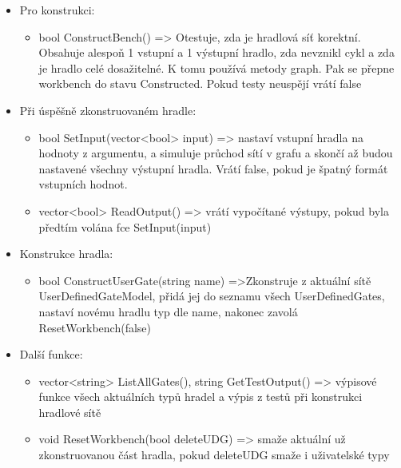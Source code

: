 \documentclass[12pt, oneside]{article}
\begin{document}
\begin{itemize}
\begin{itemize}
\begin{itemize}
\end{itemize}  
\item Pro konstrukci:
\begin{itemize} 
\item bool ConstructBench() => Otestuje, zda je hradlová síť korektní. Obsahuje alespoň 1 vstupní a 1 výstupní hradlo, zda nevznikl cykl a zda je hradlo celé dosažitelné. K tomu používá metody graph. Pak se přepne workbench do stavu Constructed. Pokud testy neuspějí vrátí false
\end{itemize} 
\item Při úspěšně zkonstruovaném hradle:
\begin{itemize}
\item bool SetInput(vector<bool> input) => nastaví vstupní hradla na hodnoty z argumentu, a simuluje průchod sítí v grafu a skončí až budou nastavené všechny výstupní hradla. Vrátí false, pokud je špatný formát vstupních hodnot. 
\item vector<bool> ReadOutput() => vrátí vypočítané výstupy, pokud byla předtím volána fce SetInput(input) 
\end{itemize}
\item Konstrukce hradla: 
\begin{itemize} 
\item bool ConstructUserGate(string name) =>Zkonstruje z aktuální sítě UserDefinedGateModel, přidá jej do seznamu všech UserDefinedGates, nastaví novému hradlu typ dle name, nakonec zavolá ResetWorkbench(false)
\end{itemize} 
\item Další funkce: 
\begin{itemize}
\item  vector<string> ListAllGates(), string GetTestOutput() => výpisové funkce všech aktuálních typů hradel a výpis z testů při konstrukci hradlové sítě
\item void ResetWorkbench(bool deleteUDG) => smaže aktuální už zkonstruovanou část hradla, pokud deleteUDG smaže i uživatelské typy
\end{itemize} 
\end{itemize} 
\end{itemize} 
\end{document}
